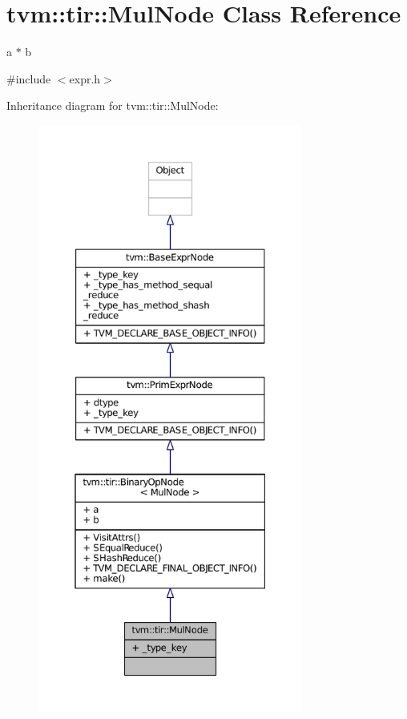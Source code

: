 \hypertarget{classtvm_1_1tir_1_1MulNode}{}\section{tvm\+:\+:tir\+:\+:Mul\+Node Class Reference}
\label{classtvm_1_1tir_1_1MulNode}


a $\ast$ b  




{\ttfamily \#include $<$expr.\+h$>$}



Inheritance diagram for tvm\+:\+:tir\+:\+:Mul\+Node\+:
\nopagebreak
\begin{figure}[H]
\begin{center}
\leavevmode
\includegraphics[height=550pt]{classtvm_1_1tir_1_1MulNode__inherit__graph}
\end{center}
\end{figure}


